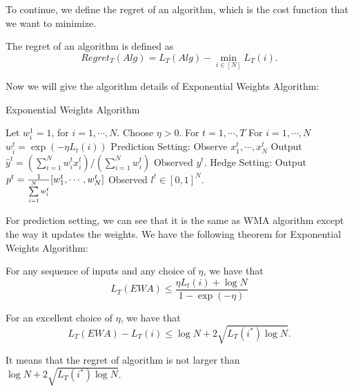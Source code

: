 \documentclass[../main.tex]{subfiles}
\begin{document}
To continue, we define the regret of an algorithm, which is the cost function that we want to minimize.

\begin{definition}
	The regret of an algorithm is defined as
	\begin{equation}
	Regret_T(Alg) = L_T(Alg) - \min\limits_{i\in [N]} L_T(i).
	\end{equation}
\end{definition}

Now we will give the algorithm details of Exponential Weights Algorithm:

\begin{algorithm}[H]
	\caption{Exponential Weights Algorithm}
	\begin{algorithmic}
		\STATE Let $w_i^1 = 1$, for $i = 1, \cdots, N$. Choose $\eta > 0$.
		\STATE For $t = 1,\cdots, T$
		\bindent
		\STATE For $i = 1,\cdots , N$
		\bindentt
		\STATE $w_i^t = \exp(-\eta L_t(i))$
		\eindentt
		\STATE Prediction Setting:
		\bindentt
		\STATE Observe $x_1^t, \cdots ,x_N^t$
		\STATE Output $\hat{y}^t = (\sum\limits_{i=1}^N w_i^t x_i^t) / (\sum\limits_{i=1}^N w_i^t)$
		\STATE Observed $y^t$.
		\eindentt
		\STATE Hedge Setting:
		\bindentt
		\STATE Output $p^t = \frac{1}{\sum\limits_{i=1}^N w_i^t} [w_1^t, \cdots, w_N^t]$
		\STATE Observed $l^t \in [0,1]^N$.
		\eindentt
		\eindent
	\end{algorithmic}
\end{algorithm}

For prediction setting, we can see that it is the same as WMA algorithm except the way it updates the weights. We have the following theorem for Exponential Weights Algorithm:

\begin{theorem}\label{ewa_theorem}
	For any sequence of inputs and any choice of $\eta$, we have that 
	\begin{equation}
	L_T(EWA) \leq \frac{\eta L_t(i) + \log N}{1 - \exp(-\eta)}
	\end{equation}
\end{theorem}

\begin{corollary}\label{ewa_corollary}
	For an excellent choice of $\eta$, we have that 
	\begin{equation}
	L_T(EWA) - L_T(i) \leq \log N + 2 \sqrt{L_T(i^*) \log N}.
	\end{equation}
	
	It means that the regret of algorithm is not larger than $\log N + 2 \sqrt{L_T(i^*) \log N}$.
\end{corollary}
\end{document}
